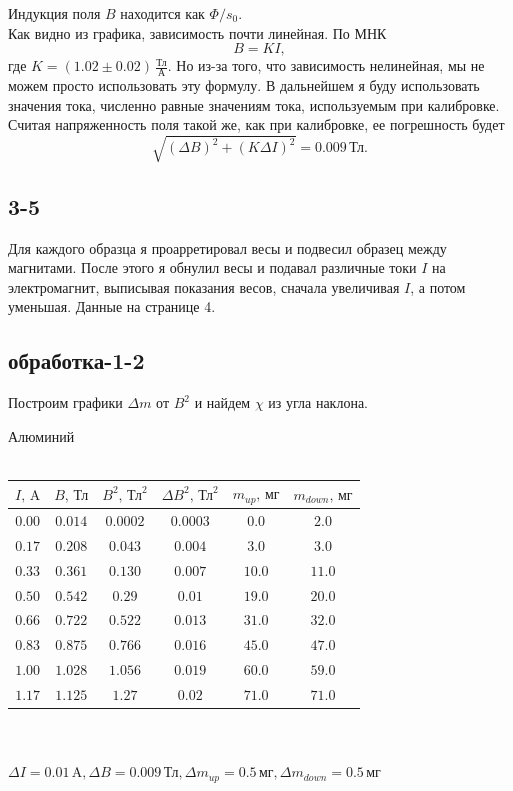 Индукция поля $B$ находится как $\Phi/s_0$.\\
Как видно из графика, зависимость почти линейная. По МНК
$$B = K I,$$
где $K = (1.02\pm0.02)\,\frac{\text{Тл}}{\text{А}}$.
Но из-за того, что зависимость нелинейная, мы не можем просто использовать эту формулу. В дальнейшем я буду использовать значения тока, численно равные значениям тока, используемым при калибровке. Считая напряженность поля такой же, как при калибровке, ее погрешность будет
$$\sqrt{(\Delta B)^2 + (K \Delta{I})^2} = 0.009\,\text{Тл}.$$

\subsection*{3-5}
Для каждого образца я проарретировал весы и подвесил образец между магнитами. После этого я обнулил весы и подавал различные токи $I$ на электромагнит, выписывая показания весов, сначала увеличивая $I$, а потом уменьшая. Данные на странице 4.

\newpage
\subsection*{обработка-1-2}
Построим графики $\Delta m$ от $B^2$ и найдем $\chi$ из угла наклона.

\begin{center}
Алюминий\\~\\
\begin{tabular}{|c|c|c|c|c|c|}\hline
$I\text{, A}$&$B\text{, Тл}$&$B^2\text{, Тл}^2$&$\Delta B^2\text{, Тл}^2$&$m_{up}\text{, мг}$&$m_{down}\text{, мг}$\\\hline
$0.00$&$0.014$&$0.0002$&$0.0003$&$0.0$&$2.0$\\\hline
$0.17$&$0.208$&$0.043$&$0.004$&$3.0$&$3.0$\\\hline
$0.33$&$0.361$&$0.130$&$0.007$&$10.0$&$11.0$\\\hline
$0.50$&$0.542$&$0.29$&$0.01$&$19.0$&$20.0$\\\hline
$0.66$&$0.722$&$0.522$&$0.013$&$31.0$&$32.0$\\\hline
$0.83$&$0.875$&$0.766$&$0.016$&$45.0$&$47.0$\\\hline
$1.00$&$1.028$&$1.056$&$0.019$&$60.0$&$59.0$\\\hline
$1.17$&$1.125$&$1.27$&$0.02$&$71.0$&$71.0$\\\hline
\end{tabular}\\~\\
$\Delta I=0.01\,\text{A}, \Delta B=0.009\,\text{Тл}, \Delta m_{up}=0.5\,\text{мг}, \Delta m_{down}=0.5\,\text{мг}$
\end{center}

